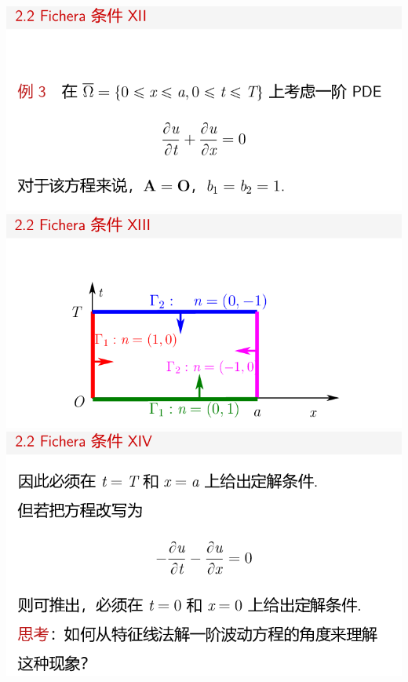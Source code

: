 \documentclass[11pt,a4paper]{ctexart}
\begin{document}
\begin{paracol}{2}
\includegraphics[width=\linewidth]{chap05_33.png}
\includegraphics[width=\linewidth]{chap05_34.png}
\includegraphics[width=\linewidth]{chap05_35.png}
\newpage


\end{paracol}
\end{document}
